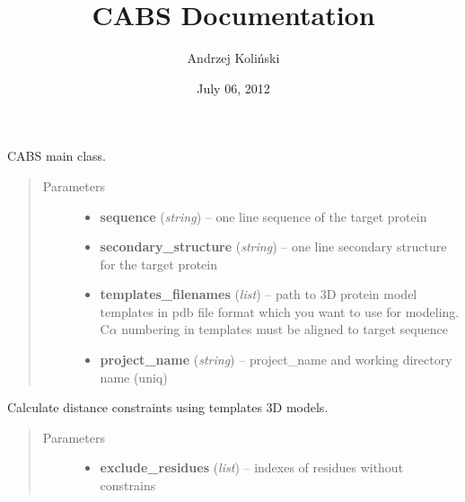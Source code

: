 \documentclass[letterpaper,10pt,english]{sphinxmanual}
\title{CABS Documentation}
\date{July 06, 2012}
\author{Andrzej Koliński}
\begin{document}
\maketitle
\tableofcontents
{}\label{index::doc}


\begin{fulllineitems}
\label{index:pycabs.CABS}
CABS main class.
\begin{quote}\begin{description}
\item[{Parameters}] \leavevmode\begin{itemize}
\item {} 
\textbf{sequence} (\emph{string}) -- one line sequence of the target protein

\item {} 
\textbf{secondary\_structure} (\emph{string}) -- one line secondary structure for the target protein

\item {} 
\textbf{templates\_filenames} (\emph{list}) -- path to 3D protein model templates in pdb file format which you want to use for modeling. C\(\alpha\) numbering in templates must be aligned to target sequence

\item {} 
\textbf{project\_name} (\emph{string}) -- project\_name and working directory name (uniq)

\end{itemize}

\end{description}\end{quote}

\begin{fulllineitems}
\label{index:pycabs.CABS.calcConstraints}
Calculate distance constraints using templates 3D models.
\begin{quote}\begin{description}
\item[{Parameters}] \leavevmode\begin{itemize}
\item {} 
\textbf{exclude\_residues} (\emph{list}) -- indexes of residues without constrains


\end{itemize}
\end{description}
\end{quote}
\end{fulllineitems}
\end{fulllineitems}
\end{document}
